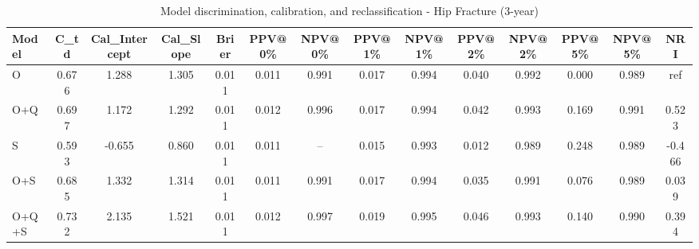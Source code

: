 \begin{table}[htbp]
\centering
\small
\caption{Model discrimination, calibration, and reclassification - Hip Fracture (3-year)}
\label{tab:perf_pd_3y}
\begin{tabular}{lccccccccccccc}
\toprule
Model & C\_td & Cal\_Intercept & Cal\_Slope & Brier & PPV@0\% & NPV@0\% & PPV@1\% & NPV@1\% & PPV@2\% & NPV@2\% & PPV@5\% & NPV@5\% & NRI \\
\midrule
O & 0.676 & 1.288 & 1.305 & 0.011 & 0.011 & 0.991 & 0.017 & 0.994 & 0.040 & 0.992 & 0.000 & 0.989 & ref \\
O+Q & 0.697 & 1.172 & 1.292 & 0.011 & 0.012 & 0.996 & 0.017 & 0.994 & 0.042 & 0.993 & 0.169 & 0.991 & 0.523 \\
S & 0.593 & -0.655 & 0.860 & 0.011 & 0.011 & -- & 0.015 & 0.993 & 0.012 & 0.989 & 0.248 & 0.989 & -0.466 \\
O+S & 0.685 & 1.332 & 1.314 & 0.011 & 0.011 & 0.991 & 0.017 & 0.994 & 0.035 & 0.991 & 0.076 & 0.989 & 0.039 \\
O+Q+S & 0.732 & 2.135 & 1.521 & 0.011 & 0.012 & 0.997 & 0.019 & 0.995 & 0.046 & 0.993 & 0.140 & 0.990 & 0.394 \\
\bottomrule
\end{tabular}
\end{table}
